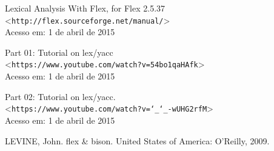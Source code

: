\newpage

\begin{thebibliography}{9}


		Lexical Analysis With Flex, for Flex 2.5.37\\
		\textless\texttt{http://flex.sourceforge.net/manual/}\textgreater\\
		Acesso em: 1 de abril de 2015

		Part 01: Tutorial on lex/yacc \\
		\textless\texttt{https://www.youtube.com/watch?v=54bo1qaHAfk}\textgreater\\
		Acesso em: 1 de abril de 2015

		Part 02: Tutorial on lex/yacc.\\
		\textless\texttt{https://www.youtube.com/watch?v=\char`_\char`_-wUHG2rfM}\textgreater\\
		Acesso em: 1 de abril de 2015

		LEVINE, John. flex \& bison. United States of America: O'Reilly, 2009.


\end{thebibliography}


